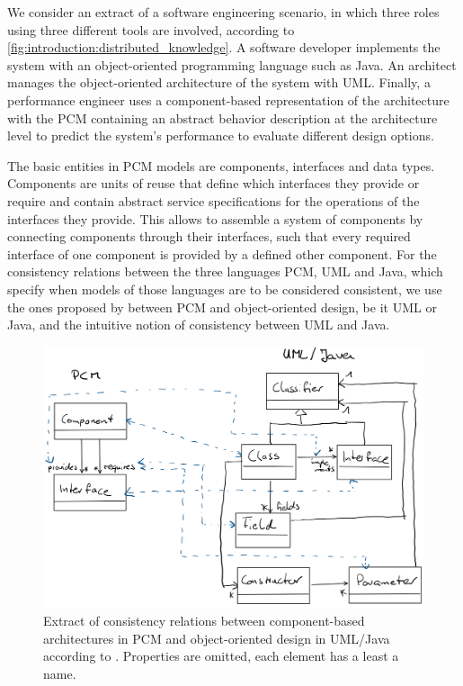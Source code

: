We consider an extract of a software engineering scenario, in which three roles using three different tools are involved, according to \autoref{fig:introduction:distributed_knowledge}. 
A software developer implements the system with an object-oriented programming language such as Java.
An architect manages the object-oriented architecture of the system with \gls{UML}. 
Finally, a performance engineer uses a component-based representation of the architecture with the \gls{PCM} containing an abstract behavior description at the architecture level to predict the system's performance to evaluate different design options.

The basic entities in \gls{PCM} models are components, interfaces and data types.
Components are units of reuse that define which interfaces they provide or require and contain abstract service specifications for the operations of the interfaces they provide.
This allows to assemble a system of components by connecting components through their interfaces, such that every required interface of one component is provided by a defined other component.
For the consistency relations between the three languages \gls{PCM}, \gls{UML} and Java, which specify when models of those languages are to be considered consistent, we use the ones proposed by \textcite{langhammer2017a} between \gls{PCM} and object-oriented design, be it \gls{UML} or Java, and the intuitive notion of consistency between \gls{UML} and Java.

\begin{figure}
    \centering
    \includegraphics[width=\textwidth]{figures/prologue/introduction/scenario_consistency_relations.png}
    \caption[Consistency relation for PCM and UML/Java]{Extract of consistency relations between component-based architectures in \gls{PCM} and object-oriented design in \gls{UML}/Java according to \cite{langhammer2017a}. Properties are omitted, each element has a least a name.}
    \label{fig:introduction:scenario_consistency_relations}
\end{figure}

